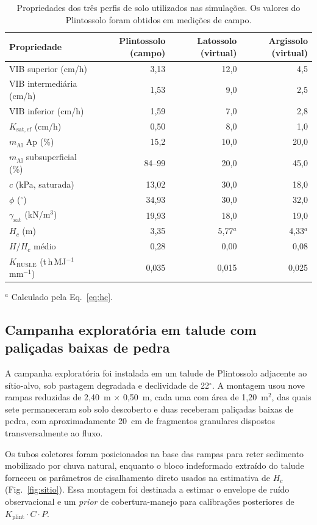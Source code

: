 \documentclass[preprint,review,12pt,authoryear]{elsarticle}
\begin{document}
\begin{table}[htbp]
\centering
\caption{Propriedades dos três perfis de solo utilizados nas simulações. Os valores do Plintossolo foram obtidos em medições de campo.}
\label{tab:profiles}
\small
\begin{tabular}{@{}l r r r@{}}
\toprule
Propriedade & Plintossolo (campo) & Latossolo (virtual) & Argissolo (virtual) \\
\midrule
VIB superior (cm/h) & 3,13 & 12,0 & 4,5 \\
VIB intermediária (cm/h) & 1,53 & 9,0 & 2,5 \\
VIB inferior (cm/h) & 1,59 & 7,0 & 2,8 \\
$K_{\mathrm{sat,ef}}$ (cm/h) & 0,50 & 8,0 & 1,0 \\
$m_{\mathrm{Al}}$ Ap (\%) & 15,2 & 10,0 & 20,0 \\
$m_{\mathrm{Al}}$ subsuperficial (\%) & 84--99 & 20,0 & 45,0 \\
$c$ (kPa, saturada) & 13,02 & 30,0 & 18,0 \\
$\phi$ ($^\circ$) & 34,93 & 30,0 & 32,0 \\
$\gamma_{\mathrm{sat}}$ (kN/m$^3$) & 19,93 & 18,0 & 19,0 \\
$H_c$ (m) & 3,35 & 5,77$^a$ & 4,33$^a$ \\
$H/H_c$ médio & 0,28 & 0,00 & 0,08 \\
$K_{\mathrm{RUSLE}}$ (t\,h\,MJ$^{-1}$\,mm$^{-1}$) & 0,035 & 0,015 & 0,025 \\
\bottomrule
\end{tabular}

\noindent $^a$ Calculado pela Eq.~\ref{eq:hc}.
\end{table}

\subsection{Campanha exploratória em talude com paliçadas baixas de pedra}
\label{sec:field-palisades}

A campanha exploratória foi instalada em um talude de Plintossolo adjacente ao sítio-alvo, sob pastagem degradada e declividade de 22$^{\circ}$. A montagem usou nove rampas reduzidas de 2,40~m $\times$ 0,50~m, cada uma com área de 1,20~m$^2$, das quais sete permaneceram sob solo descoberto e duas receberam paliçadas baixas de pedra, com aproximadamente 20~cm de fragmentos granulares dispostos transversalmente ao fluxo. 

Os tubos coletores foram posicionados na base das rampas para reter sedimento mobilizado por chuva natural, enquanto o bloco indeformado extraído do talude forneceu os parâmetros de cisalhamento direto usados na estimativa de $H_c$ (Fig.~\ref{fig:sitio}). Essa montagem foi destinada a estimar o envelope de ruído observacional e um \emph{prior} de cobertura-manejo para calibrações posteriores de $K_{\mathrm{plint}} \cdot C \cdot P$.
\end{document}
